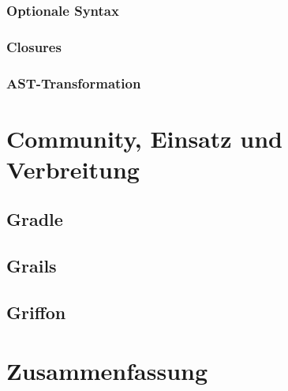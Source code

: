 	\subsubsection{Optionale Syntax}\label{subsubsec:optionale-syntax}


	\subsubsection{Closures}\label{subsubsec:closures}


	\subsubsection{AST-Transformation}



	\section{Community, Einsatz und Verbreitung}\label{sec:community}


	\subsection{Gradle}\label{subsec:gradle}


	\subsection{Grails}\label{subsec:grails}


	\subsection{Griffon}\label{subsec:griffon}



	\section{Zusammenfassung}\label{sec:zusammenfassung}



	
	



